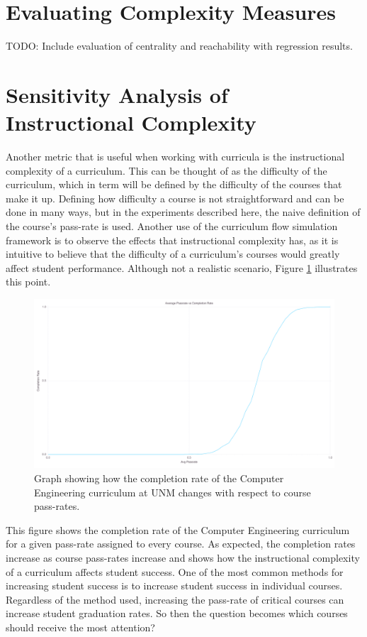 \documentclass[botnum, fleqn]{unmeethesis}
\begin{document}
  \section{Evaluating Complexity Measures}  
    TODO: Include evaluation of centrality and reachability with regression results.


  \section{Sensitivity Analysis of Instructional Complexity}
    Another metric that is useful when working with curricula is the instructional complexity of a curriculum. This can be thought of as the difficulty of the curriculum, which in term will be defined by the difficulty of the courses that make it up. Defining how difficulty a course is not straightforward and can be done in many ways, but in the experiments described here, the naive definition of the course's pass-rate is used. Another use of the curriculum flow simulation framework is to observe the effects that instructional complexity has, as it is intuitive to believe that the difficulty of a curriculum's courses would greatly affect student performance. Although not a realistic scenario, Figure \ref{fig:instructional} illustrates this point.

    \begin{figure}[h!]
      \centerline{\includegraphics[scale=0.2]{./figures/instructional.png}}
      \caption{Graph showing how the completion rate of the Computer Engineering curriculum at UNM changes with respect to course pass-rates.} 
      \label{fig:instructional}
    \end{figure}

    This figure shows the completion rate of the Computer Engineering curriculum for a given pass-rate assigned to every course. As expected, the completion rates increase as course pass-rates increase and shows how the instructional complexity of a curriculum affects student success. One of the most common methods for increasing student success is to increase student success in individual courses. Regardless of the method used, increasing the pass-rate of critical courses can increase student graduation rates. So then the question becomes which courses should receive the most attention?
\end{document}
